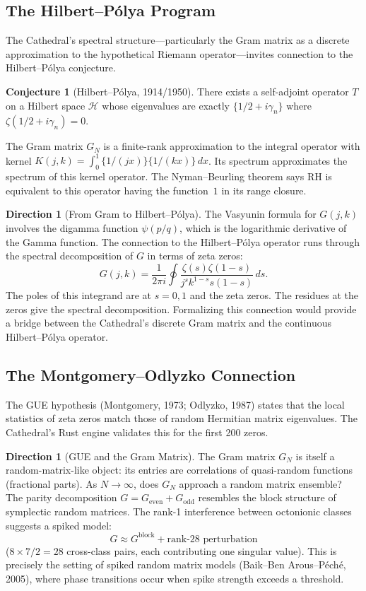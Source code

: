 \documentclass[11pt,a4paper]{article}
\theoremstyle{definition}
\newtheorem{conjecture}[definition]{Conjecture}
\newtheorem{direction}[definition]{Direction}
\begin{document}
\subsection{The Hilbert--P\'olya Program}

The Cathedral's spectral structure---particularly the Gram matrix as a
discrete approximation to the hypothetical Riemann operator---invites
connection to the Hilbert--P\'olya conjecture.

\begin{conjecture}[Hilbert--P\'olya, 1914/1950]
There exists a self-adjoint operator $T$ on a Hilbert space $\mathcal{H}$
whose eigenvalues are exactly $\{1/2 + i\gamma_n\}$ where
$\zeta(1/2 + i\gamma_n) = 0$.
\end{conjecture}

The Gram matrix $G_N$ is a finite-rank approximation to the integral
operator with kernel $K(j,k) = \int_0^1 \{1/(jx)\}\{1/(kx)\}\,dx$.
Its spectrum approximates the spectrum of this kernel operator. The
Nyman--Beurling theorem says RH is equivalent to this operator having
the function~$1$ in its range closure.

\begin{direction}[From Gram to Hilbert--P\'olya]
The Vasyunin formula for $G(j,k)$ involves the digamma function
$\psi(p/q)$, which is the logarithmic derivative of the Gamma function.
The connection to the Hilbert--P\'olya operator runs through the
spectral decomposition of $G$ in terms of zeta zeros:
\[
  G(j,k) = \frac{1}{2\pi i} \oint \frac{\zeta(s)\zeta(1-s)}{j^s k^{1-s} s(1-s)}\,ds.
\]
The poles of this integrand are at $s = 0, 1$ and the zeta zeros.
The residues at the zeros give the spectral decomposition. Formalizing
this connection would provide a bridge between the Cathedral's discrete
Gram matrix and the continuous Hilbert--P\'olya operator.
\end{direction}

\subsection{The Montgomery--Odlyzko Connection}

The GUE hypothesis (Montgomery, 1973; Odlyzko, 1987) states that the
local statistics of zeta zeros match those of random Hermitian matrix
eigenvalues. The Cathedral's Rust engine validates this for the first
200 zeros.

\begin{direction}[GUE and the Gram Matrix]
The Gram matrix $G_N$ is itself a random-matrix-like object: its entries
are correlations of quasi-random functions (fractional parts). As $N \to
\infty$, does $G_N$ approach a random matrix ensemble? The parity
decomposition $G = G_{\mathrm{even}} + G_{\mathrm{odd}}$ resembles the
block structure of symplectic random matrices. The rank-1 interference
between octonionic classes suggests a spiked model:
\[
  G \approx G^{\mathrm{block}} + \text{rank-28 perturbation}
\]
($8 \times 7 / 2 = 28$ cross-class pairs, each contributing one singular
value). This is precisely the setting of spiked random matrix models
(Baik--Ben Arous--P\'ech\'e, 2005), where phase transitions occur
when spike strength exceeds a threshold.
\end{direction}
\end{document}

